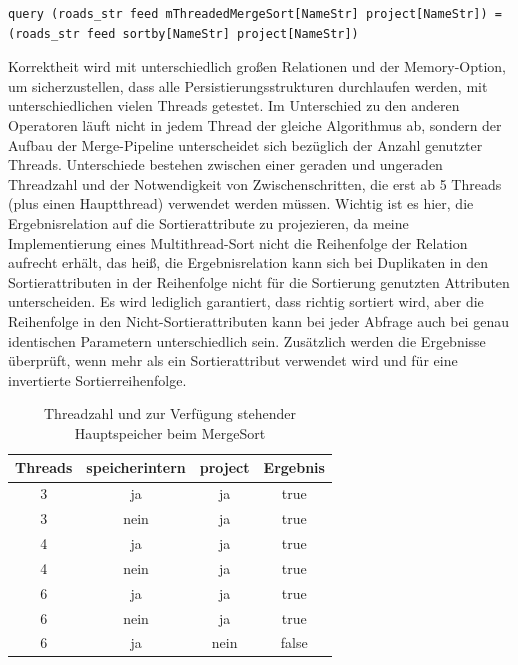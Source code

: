 \documentclass[a4paper,12pt,twoside]{article}
\begin{document}
\begin{minipage}{\linewidth}
	\begin{lstlisting}[caption={Beispiel Testqueries für den Sort-Operator}, label=list:testsort]
	query (roads_str feed mThreadedMergeSort[NameStr] project[NameStr]) = (roads_str feed sortby[NameStr] project[NameStr]) 
	\end{lstlisting}
\end{minipage}

Korrektheit wird mit unterschiedlich großen Relationen und der Memory-Option, um sicherzustellen, dass alle Persistierungsstrukturen durchlaufen werden, mit unterschiedlichen vielen Threads getestet. Im Unterschied zu den anderen Operatoren läuft nicht in jedem Thread der gleiche Algorithmus ab, sondern der Aufbau der Merge-Pipeline unterscheidet sich bezüglich der Anzahl genutzter Threads. Unterschiede bestehen zwischen einer geraden und ungeraden Threadzahl und der Notwendigkeit von Zwischenschritten, die erst ab 5 Threads (plus einen Hauptthread) verwendet werden müssen. Wichtig ist es hier, die Ergebnisrelation auf die Sortierattribute zu projezieren, da meine Implementierung eines Multithread-Sort nicht die Reihenfolge der Relation aufrecht erhält, das heiß, die Ergebnisrelation kann sich bei Duplikaten in den Sortierattributen in der Reihenfolge nicht für die Sortierung genutzten Attributen unterscheiden. Es wird lediglich garantiert, dass richtig sortiert wird, aber die Reihenfolge in den Nicht-Sortierattributen kann bei jeder Abfrage auch bei genau identischen Parametern unterschiedlich sein. Zusätzlich werden die Ergebnisse überprüft, wenn mehr als ein Sortierattribut verwendet wird und für eine invertierte Sortierreihenfolge.

\begin{table}
	\centering
\begin{tabular}{|c|c|c|c|}
	\hline 
	Threads\footnotemark & speicherintern & project & Ergebnis \\ 
	\hline 
	3 & ja & ja & true \\ 
	\hline 
	3 & nein & ja & true \\ 
	\hline 
	4 & ja & ja & true \\ 
	\hline 
	4 & nein & ja  & true \\ 
	\hline 
	6 & ja & ja & true \\ 
	\hline
	6 & nein & ja & true \\ 
	\hline
	6 & ja & nein & false \\ 
	\hline 
\end{tabular}
\caption{\label{tab:testSort} Threadzahl und zur Verfügung stehender Hauptspeicher beim MergeSort}
\end{table}
\end{document}

